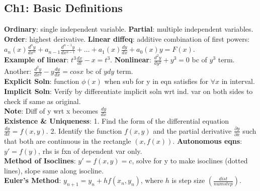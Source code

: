 \subsection*{Ch1: Basic Definitions}
\textbf{Ordinary}: single independent variable. 
\textbf{Partial}: multiple independent variables.
\textbf{Order}: highest derivative.
\textbf{Linear diffeq}: additive combination of first powers: $a_n(x)\frac{d^ny}{dx^n} + a_{n-1} \frac{d^{n-1}y}{dx^{n-1}} + \dots + a_1(x)\frac{dy}{dx} + a_0(x)y = F(x)$. \\
\textbf{Example of linear}: $t^3 \frac{dx}{dt} - x = t^3$. \textbf{Nonlinear}: $\frac{d^2y}{dy^2} + y^3 = 0$ bc of $y^3$ term. Another: $\frac{d^2y}{dx^2} - y\frac{dy}{dx} = cosx$ bc of $ydy$ term. \\
\textbf{Explicit Soln}: function $\phi(x)$ when sub for y in eqn satisfies for $\forall x$ in interval. \textbf{Implicit Soln}: Verify by differentiate implicit soln wrt ind. var on both sides to check if same as original. \\
\textbf{Note}: Diff of y wrt x becomes $\frac{dy}{dx}$ \\
\textbf{Existence \& Uniqueness}:
1. Find the form of the differential equation $\frac{dy}{dx} = f(x,y)$.
2. Identify the function $f(x,y)$ and the partial derivative $\frac{\partial y}{\partial x}$ such that both are continuous in the rectangle $(x,f(x))$.
\textbf{Autonomous eqns}: $y' = f(y)$, rhs is fxn of dependent var only. \\
\textbf{Method of Isoclines}: $y' = f(x,y) = c$, solve for y to make isoclines (dotted lines), slope same along isocline. \\
\textbf{Euler's Method}: $y_{n+1} = y_n + hf(x_n,y_n)$, where $h$ is step size $(\frac{dist}{num step})$. \\